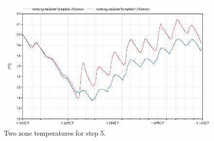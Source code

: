 \documentclass[10pt,a4paper]{article}
\begin{document}
\begin{figure}
\centering
\includegraphics[scale=0.7]{Example5.png}
\caption{Two zone temperatures for step 5.}
\label{fig:res5}
\end{figure}
\end{document}
